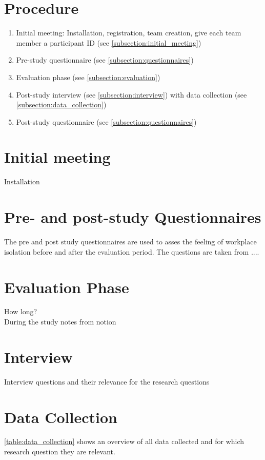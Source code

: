 \section{Procedure}
\begin{enumerate}
    \item Initial meeting: Installation, registration, team creation, give each team member a participant ID (see \autoref{subsection:initial_meeting})
    \item Pre-study questionnaire (see \autoref{subsection:questionnaires})
    \item Evaluation phase (see \autoref{subsection:evaluation})
    \item Post-study interview (see \autoref{subsection:interview}) with data collection (see \autoref{subsection:data_collection})
    \item  Post-study questionnaire (see \autoref{subsection:questionnaires})
\end{enumerate}

\section{Initial meeting}
\label{subsection:initial_meeting}
Installation

\section{Pre- and post-study Questionnaires}
\label{subsection:questionnaires}
The pre and post study questionnaires are used to asses the feeling of workplace isolation before and after the evaluation period. The questions are taken from ....

\section{Evaluation Phase}
\label{subsection:evaluation}
How long? \\
During the study notes from notion

\section{Interview}
\label{subsection:interview}
Interview questions and their relevance for the research questions

\section{Data Collection}
\label{subsection:data_collection}
\autoref{table:data_collection} shows an overview of all data collected and for which research question they are relevant.

